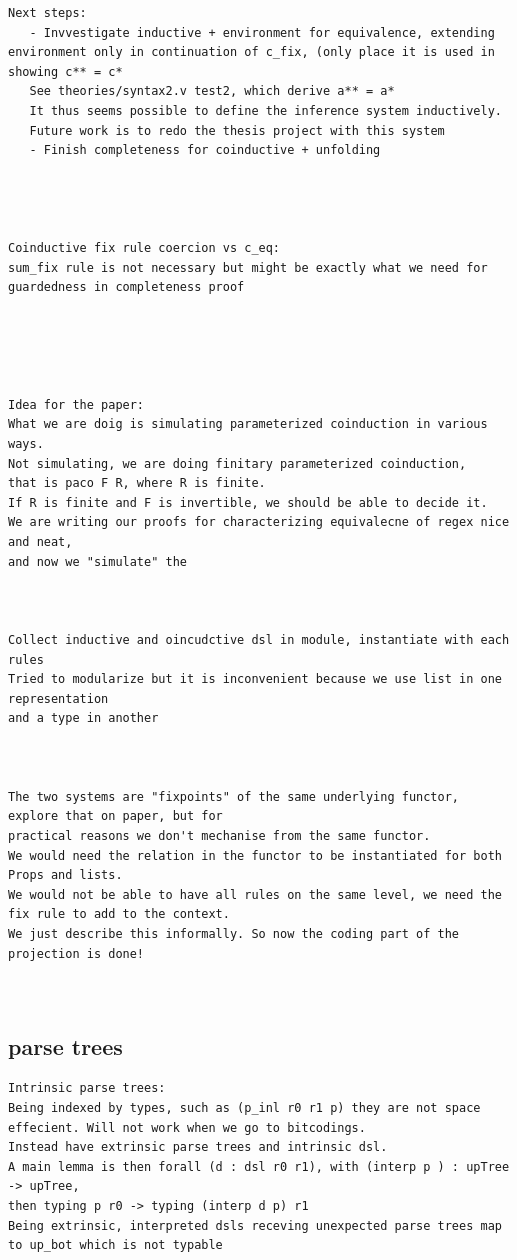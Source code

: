 \documentclass[a4paper,UKenglish,cleveref, autoref, thm-restate]{lipics-v2021}
\begin{document}
\begin{verbatim}
Next steps:
   - Invvestigate inductive + environment for equivalence, extending environment only in continuation of c_fix, (only place it is used in showing c** = c*
   See theories/syntax2.v test2, which derive a** = a*
   It thus seems possible to define the inference system inductively.
   Future work is to redo the thesis project with this system
   - Finish completeness for coinductive + unfolding




Coinductive fix rule coercion vs c_eq:
sum_fix rule is not necessary but might be exactly what we need for guardedness in completeness proof





Idea for the paper:
What we are doig is simulating parameterized coinduction in various ways. 
Not simulating, we are doing finitary parameterized coinduction,
that is paco F R, where R is finite. 
If R is finite and F is invertible, we should be able to decide it.
We are writing our proofs for characterizing equivalecne of regex nice and neat,
and now we "simulate" the 



Collect inductive and oincudctive dsl in module, instantiate with each rules
Tried to modularize but it is inconvenient because we use list in one representation
and a type in another



The two systems are "fixpoints" of the same underlying functor, explore that on paper, but for 
practical reasons we don't mechanise from the same functor. 
We would need the relation in the functor to be instantiated for both Props and lists.
We would not be able to have all rules on the same level, we need the fix rule to add to the context.
We just describe this informally. So now the coding part of the projection is done!



\end{verbatim}

\subsection{parse trees}
\begin{verbatim}
Intrinsic parse trees:
Being indexed by types, such as (p_inl r0 r1 p) they are not space effecient. Will not work when we go to bitcodings.
Instead have extrinsic parse trees and intrinsic dsl.
A main lemma is then forall (d : dsl r0 r1), with (interp p ) : upTree -> upTree, 
then typing p r0 -> typing (interp d p) r1  
Being extrinsic, interpreted dsls receving unexpected parse trees map to up_bot which is not typable

\end{verbatim}
\end{document}
